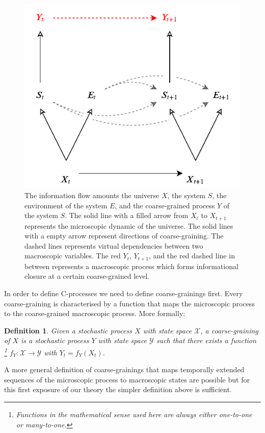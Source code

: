 \documentclass[utf8]{article}
\newtheorem{definition}{Definition}
\begin{document}
        
		\begin{figure}[H]
		    \centering
			\includegraphics[width=\textwidth]{WritingMaterials/Fig_FullGraph/FullGraph.pdf}
			\caption{The information flow amounts the universe $X$, the system $S$, the environment of the system $E$, and the coarse-grained process $Y$ of the system $S$. The solid line with a filled arrow from $X_t$ to $X_{t+1}$ represents the microscopic dynamic of the universe. The solid lines with a empty arrow represent directions of coarse-graining. The dashed lines represents virtual dependencies between  two macroscopic variables. The red $Y_t$, $Y_{t+1}$, and the red dashed line in between represents a macroscopic process which forms informational closure at a certain coarse-grained level.}
			\label{fig:fullgraph}
	   	\end{figure}

	   	In order to define C-processes we need to define coarse-grainings first. Every coarse-graining is characterised by a function that maps the microscopic process to the coarse-grained macroscopic process. More formally: 
	   	
	   	\begin{definition}
	   	 Given a stochastic process $X$ with state space $\mathcal{X}$, a \emph{coarse-graining of $X$} is a stochastic process $Y$ with state space $\mathcal{Y}$ such that there exists a function \footnote{Functions in the mathematical sense used here are always either one-to-one or many-to-one.} $f_Y:\mathcal{X}\rightarrow \mathcal{Y}$ with $Y_t=f_Y(X_t)$.  
	   	\end{definition}
	   	A more general definition of coarse-grainings that maps temporally extended sequences of the microscopic process to macroscopic states are possible but for this first exposure of our theory the simpler definition above is sufficient. 
	   	
\end{document}
